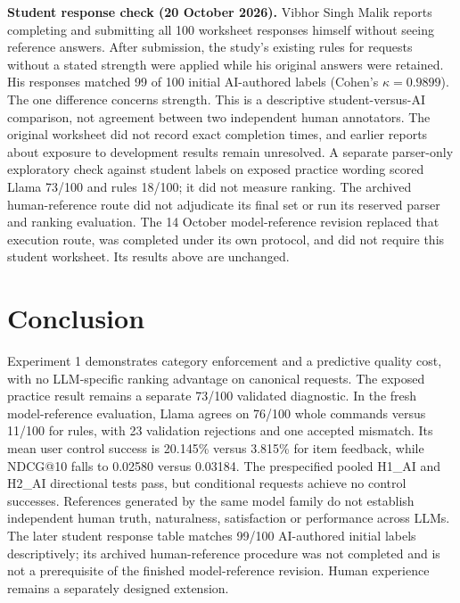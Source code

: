 \documentclass[conference]{IEEEtran}
\begin{document}
\noindent\textbf{Student response check (20 October 2026).} Vibhor Singh Malik reports completing and submitting all 100 worksheet responses himself without seeing reference answers. After submission, the study's existing rules for requests without a stated strength were applied while his original answers were retained. His responses matched 99 of 100 initial AI-authored labels (Cohen's $\kappa=0.9899$). The one difference concerns strength. This is a descriptive student-versus-AI comparison, not agreement between two independent human annotators. The original worksheet did not record exact completion times, and earlier reports about exposure to development results remain unresolved. A separate parser-only exploratory check against student labels on exposed practice wording scored Llama 73/100 and rules 18/100; it did not measure ranking. The archived human-reference route did not adjudicate its final set or run its reserved parser and ranking evaluation. The 14 October model-reference revision replaced that execution route, was completed under its own protocol, and did not require this student worksheet. Its results above are unchanged.

\section{Conclusion}
Experiment 1 demonstrates category enforcement and a predictive quality cost, with no LLM-specific ranking advantage on canonical requests. The exposed practice result remains a separate 73/100 validated diagnostic. In the fresh model-reference evaluation, Llama agrees on 76/100 whole commands versus 11/100 for rules, with 23 validation rejections and one accepted mismatch. Its mean user control success is 20.145\% versus 3.815\% for item feedback, while NDCG@10 falls to 0.02580 versus 0.03184. The prespecified pooled H1\_AI and H2\_AI directional tests pass, but conditional requests achieve no control successes. References generated by the same model family do not establish independent human truth, naturalness, satisfaction or performance across LLMs. The later student response table matches 99/100 AI-authored initial labels descriptively; its archived human-reference procedure was not completed and is not a prerequisite of the finished model-reference revision. Human experience remains a separately designed extension.



\end{document}
